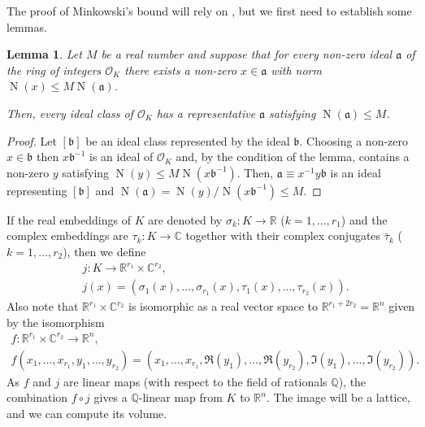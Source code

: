 \documentclass[12pt]{article}
\newtheorem{lemma}{Lemma}
\begin{document}
The proof of Minkowski's bound will rely on , but we first need to establish some lemmas.

\begin{lemma}\label{lem:1}
Let $M$ be a real number and suppose that for every non-zero ideal $\mathfrak{a}$ of the ring of integers $\mathcal{O}_K$ there exists a non-zero $x\in\mathfrak{a}$ with norm $\operatorname{N}(x)\le M \operatorname{N}(\mathfrak{a})$.

Then, every ideal class of $\mathcal{O}_K$ has a representative $\mathfrak{a}$ satisfying $\operatorname{N}(\mathfrak{a})\le M$.
\end{lemma}
\begin{proof}
Let $[\mathfrak{b}]$ be an ideal class represented by the ideal $\mathfrak{b}$. Choosing a non-zero $x\in\mathfrak{b}$ then $x\mathfrak{b}^{-1}$ is an ideal of $\mathcal{O}_K$ and, by the condition of the lemma, contains a non-zero $y$ satisfying $\operatorname{N}(y)\le M \operatorname{N}(x\mathfrak{b}^{-1})$.
Then, $\mathfrak{a}\equiv x^{-1}y\mathfrak{b}$ is an ideal representing $[\mathfrak{b}]$ and $\operatorname{N}(\mathfrak{a})=\operatorname{N}(y)/\operatorname{N}(x\mathfrak{b}^{-1})\le M$.
\end{proof}

If the real embeddings of $K$ are denoted by $\sigma_k\colon K\rightarrow\mathbb{R}$ ($k=1,\ldots,r_1$) and the complex embeddings are $\tau_k\colon K\rightarrow\mathbb{C}$ together with their complex conjugates $\bar\tau_k$ ($k=1,\ldots,r_2$), then we define
\begin{align*}
&j\colon K\rightarrow\mathbb{R}^{r_1}\times\mathbb{C}^{r_2},\\
&j(x)=(\sigma_1(x),\ldots,\sigma_{r_1}(x),\tau_1(x),\ldots,\tau_{r_2}(x)).
\end{align*}
Also note that $\mathbb{R}^{r_1}\times\mathbb{C}^{r_2}$ is isomorphic as a real vector space to $\mathbb{R}^{r_1+2r_2}=\mathbb{R}^{n}$ given by the isomorphism
\begin{gather*}
f\colon\mathbb{R}^{r_1}\times\mathbb{C}^{r_2}\rightarrow\mathbb{R}^n,\\
f(x_1,\dots,x_{r_1},y_{1},\ldots,y_{r_2})=(x_1,\ldots,x_{r_1},\Re(y_{1}),\ldots,\Re(y_{r_2}),\Im(y_{1}),\ldots,\Im(y_{r_2})).
\end{gather*}
As $f$ and $j$ are linear maps (with respect to the field of rationals $\mathbb{Q}$), the combination $f\circ j$ gives a $\mathbb{Q}$-linear map from $K$ to $\mathbb{R}^n$. The image will be a lattice, and we can compute its volume.
\end{document}
